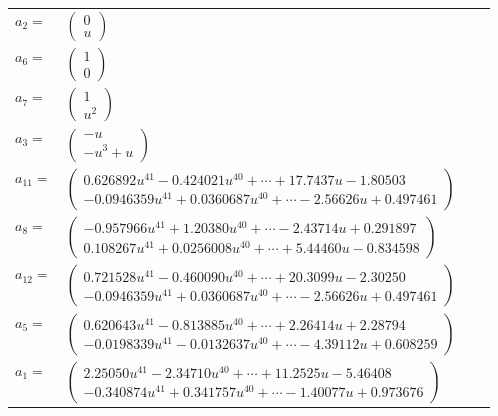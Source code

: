 \documentclass[1p]{elsarticle_modified}
\theoremstyle{definition}
\begin{document}
\begin{tabular}{m{7pt} m{180pt} m{7pt} m{180pt} }
\flushright $a_{2}=$&$\begin{pmatrix}0\\u\end{pmatrix}$ \\
\flushright $a_{6}=$&$\begin{pmatrix}1\\0\end{pmatrix}$ \\
\flushright $a_{7}=$&$\begin{pmatrix}1\\u^2\end{pmatrix}$ \\
\flushright $a_{3}=$&$\begin{pmatrix}- u\\- u^3+u\end{pmatrix}$ \\
\flushright $a_{11}=$&$\begin{pmatrix}0.626892 u^{41}-0.424021 u^{40}+\cdots+17.7437 u-1.80503\\-0.0946359 u^{41}+0.0360687 u^{40}+\cdots-2.56626 u+0.497461\end{pmatrix}$ \\
\flushright $a_{8}=$&$\begin{pmatrix}-0.957966 u^{41}+1.20380 u^{40}+\cdots-2.43714 u+0.291897\\0.108267 u^{41}+0.0256008 u^{40}+\cdots+5.44460 u-0.834598\end{pmatrix}$ \\
\flushright $a_{12}=$&$\begin{pmatrix}0.721528 u^{41}-0.460090 u^{40}+\cdots+20.3099 u-2.30250\\-0.0946359 u^{41}+0.0360687 u^{40}+\cdots-2.56626 u+0.497461\end{pmatrix}$ \\
\flushright $a_{5}=$&$\begin{pmatrix}0.620643 u^{41}-0.813885 u^{40}+\cdots+2.26414 u+2.28794\\-0.0198339 u^{41}-0.0132637 u^{40}+\cdots-4.39112 u+0.608259\end{pmatrix}$ \\
\flushright $a_{1}=$&$\begin{pmatrix}2.25050 u^{41}-2.34710 u^{40}+\cdots+11.2525 u-5.46408\\-0.340874 u^{41}+0.341757 u^{40}+\cdots-1.40077 u+0.973676\end{pmatrix}$ \\

\end{tabular}
\end{document}
